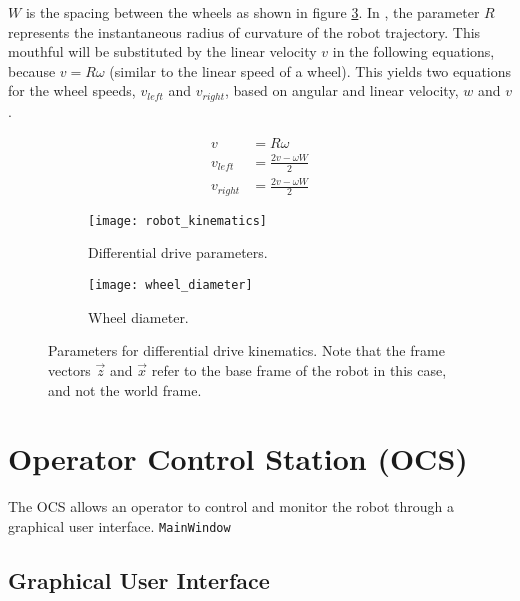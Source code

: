 $W$ is the spacing between the wheels as shown in figure \ref{fig:robot_kinematics}. In \cite{cook2011mobile}, the parameter $R$ represents the instantaneous radius of curvature of the robot trajectory. This mouthful will be substituted by the linear velocity $v$ in the following equations, because $v = R\omega$ (similar to the linear speed of a wheel). This yields two equations for the wheel speeds, $v_{left}$ and $v_{right}$, based on angular and linear velocity, $w$ and $v$.

 \begin{subequations}%
 	\begin{align}
 	v &= R\omega \\
 	v_{left} &=  \frac{2v - \omega W}{2}\\
 	v_{right} &= \frac{2v - \omega W}{2} %
 	\end{align}
 \end{subequations}



 \begin{figure}
 	\centering
 	\begin{subfigure}[b]{0.58\textwidth}
 		\texttt{[image: robot\_kinematics]}
 		\caption{Differential drive parameters.}
 		\label{fig:robot_kinematics}
 	\end{subfigure}
 	\begin{subfigure}[b]{0.38\textwidth}
 		
 		\texttt{[image: wheel\_diameter]}
 		\caption{Wheel diameter.}
 		\label{fig:wheel_diameter}
 	\end{subfigure}
 	\caption{\label{fig:robot_kinematics}Parameters for differential drive kinematics. Note that the frame vectors $\vec{z}$ and $\vec{x}$ refer to the base frame of the robot in this case, and not the world frame.}
 \end{figure}

\section{Operator Control Station (OCS)}

The \ac{OCS} allows an operator to control and monitor the robot through a graphical user interface. \texttt{MainWindow}

\subsection{Graphical User Interface}

